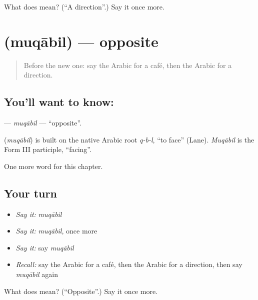 \begin{tcolorbox}[breakable,colback=teal!4,colframe=teal!35!black,title={Before you move on}]
What does  mean? (\textquotedblleft{}A direction\textquotedblright{}.) Say it once more.
\end{tcolorbox}
\section[\texorpdfstring{\ar{مقابل} (muqābil)}{مقابل (muqābil)}]{ (muqābil) — opposite}

\label{lesson:AR-C172-muqabil}



\begin{quote}
Before the new one: say the Arabic for a café, then the Arabic for a direction.
\end{quote}

\subsection*{You'll want to know: }
\textbf{} — \emph{muqābil} — \textquotedblleft{}opposite\textquotedblright{}.

\begin{cousinweb}
\textbf{} (\emph{muqābil}) is built on the native Arabic root \emph{q-b-l}, \textquotedblleft{}to face\textquotedblright{} (Lane). \emph{Muqābil} is the Form III participle, \textquotedblleft{}facing\textquotedblright{}.
\end{cousinweb}

\begin{grammarlens}[title={What you've built}]
One more word for this chapter.
\end{grammarlens}

\subsection*{Your turn}
\begin{itemize}
\raggedright
  \item \emph{Say it:} \emph{muqābil}
  \item \emph{Say it:} \emph{muqābil}, once more
  \item \emph{Say it:} say \emph{muqābil}
  \item \emph{Recall:} say the Arabic for a café, then the Arabic for a direction, then say \emph{muqābil} again
\end{itemize}

\begin{tcolorbox}[breakable,colback=teal!4,colframe=teal!35!black,title={Before you move on}]
What does  mean? (\textquotedblleft{}Opposite\textquotedblright{}.) Say it once more.
\end{tcolorbox}
